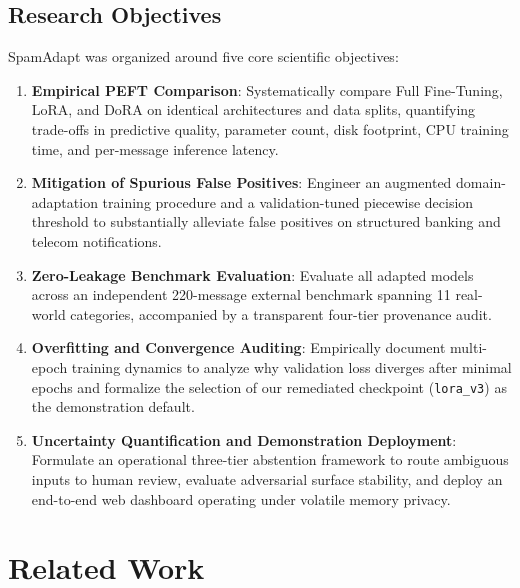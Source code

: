 \documentclass[conference]{IEEEtran}
\begin{document}
\subsection{Research Objectives}
SpamAdapt was organized around five core scientific objectives:
\begin{enumerate}
    \item \textbf{Empirical PEFT Comparison}: Systematically compare Full Fine-Tuning, LoRA, and DoRA on identical architectures and data splits, quantifying trade-offs in predictive quality, parameter count, disk footprint, CPU training time, and per-message inference latency.
    \item \textbf{Mitigation of Spurious False Positives}: Engineer an augmented domain-adaptation training procedure and a validation-tuned piecewise decision threshold to substantially alleviate false positives on structured banking and telecom notifications.
    \item \textbf{Zero-Leakage Benchmark Evaluation}: Evaluate all adapted models across an independent 220-message external benchmark spanning 11 real-world categories, accompanied by a transparent four-tier provenance audit.
    \item \textbf{Overfitting and Convergence Auditing}: Empirically document multi-epoch training dynamics to analyze why validation loss diverges after minimal epochs and formalize the selection of our remediated checkpoint (\texttt{lora\_v3}) as the demonstration default.
    \item \textbf{Uncertainty Quantification and Demonstration Deployment}: Formulate an operational three-tier abstention framework to route ambiguous inputs to human review, evaluate adversarial surface stability, and deploy an end-to-end web dashboard operating under volatile memory privacy.
\end{enumerate}

\section{Related Work}
\label{sec:related_work}
\end{document}
